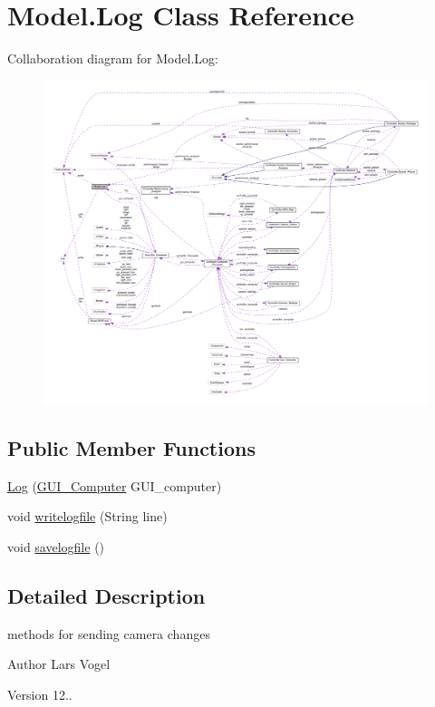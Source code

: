 \hypertarget{class_model_1_1_log}{}\section{Model.\+Log Class Reference}
\label{class_model_1_1_log}


Collaboration diagram for Model.\+Log\+:
\nopagebreak
\begin{figure}[H]
\begin{center}
\leavevmode
\includegraphics[width=350pt]{class_model_1_1_log__coll__graph}
\end{center}
\end{figure}
\subsection*{Public Member Functions}
\begin{DoxyCompactItemize}
\item 
\hyperlink{class_model_1_1_log_a9056cbc847b49dcb9029832755d844bb}{Log} (\hyperlink{class_view_1_1_g_u_i___computer}{G\+U\+I\+\_\+\+Computer} G\+U\+I\+\_\+computer)
\item 
void \hyperlink{class_model_1_1_log_af78cab944fbd65179f84beb4dc0b091a}{writelogfile} (String line)
\item 
void \hyperlink{class_model_1_1_log_a7aaa79eed898d1b841f48376ebb32a7a}{savelogfile} ()
\end{DoxyCompactItemize}


\subsection{Detailed Description}
methods for sending camera changes \begin{DoxyAuthor}{Author}
Lars Vogel 
\end{DoxyAuthor}
\begin{DoxyVersion}{Version}
12.. 
\end{DoxyVersion}


